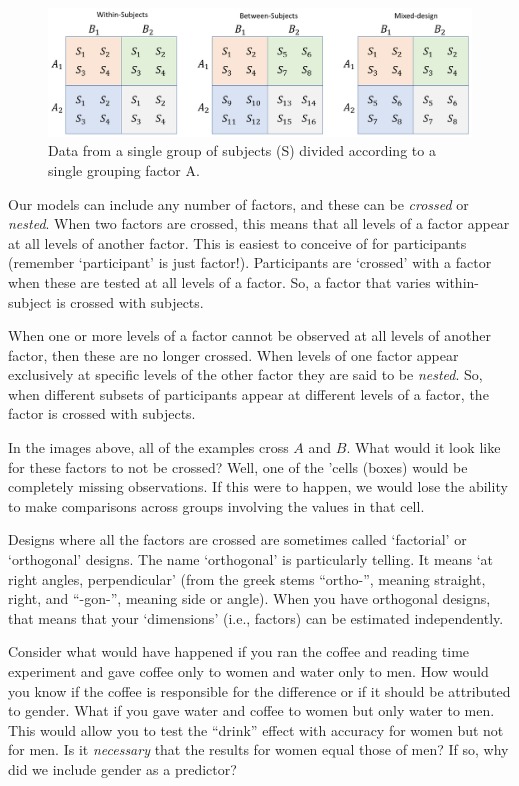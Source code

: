 \documentclass[
]{book}
\begin{document}
\begin{figure}

{\centering \includegraphics[width=1\linewidth]{./images/design_ch4_2} 

}

\caption{Data from a single group of subjects (S) divided according to a single grouping factor A.}\label{fig:F4-designfig2}
\end{figure}

Our models can include any number of factors, and these can be \emph{crossed} or \emph{nested}. When two factors are crossed, this means that all levels of a factor appear at all levels of another factor. This is easiest to conceive of for participants (remember `participant' is just factor!). Participants are `crossed' with a factor when these are tested at all levels of a factor. So, a factor that varies within-subject is crossed with subjects.

When one or more levels of a factor cannot be observed at all levels of another factor, then these are no longer crossed. When levels of one factor appear exclusively at specific levels of the other factor they are said to be \emph{nested}. So, when different subsets of participants appear at different levels of a factor, the factor is crossed with subjects.

In the images above, all of the examples cross \(A\) and \(B\). What would it look like for these factors to not be crossed? Well, one of the 'cells (boxes) would be completely missing observations. If this were to happen, we would lose the ability to make comparisons across groups involving the values in that cell.

Designs where all the factors are crossed are sometimes called `factorial' or `orthogonal' designs. The name `orthogonal' is particularly telling. It means `at right angles, perpendicular' (from the greek stems ``ortho-'', meaning straight, right, and ``-gon-'', meaning side or angle). When you have orthogonal designs, that means that your `dimensions' (i.e., factors) can be estimated independently.

Consider what would have happened if you ran the coffee and reading time experiment and gave coffee only to women and water only to men. How would you know if the coffee is responsible for the difference or if it should be attributed to gender. What if you gave water and coffee to women but only water to men. This would allow you to test the ``drink'' effect with accuracy for women but not for men. Is it \emph{necessary} that the results for women equal those of men? If so, why did we include gender as a predictor?
\end{document}
